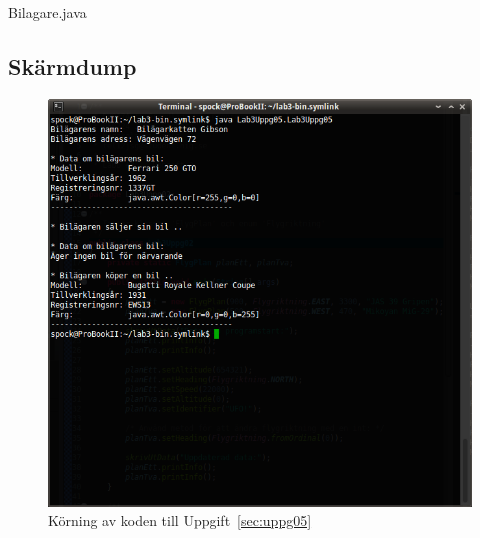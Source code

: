 \caption{Bilagare.java}
\label{src:bilagare}

\subsection{Skärmdump}
\begin{figure}[htbp]
    \centering
        \includegraphics[width=\linewidth]{img/05.png}
    \caption{Körning av koden till Uppgift~\ref{sec:uppg05}}
    \label{fig:uppg05-screenshot}
\end{figure}

